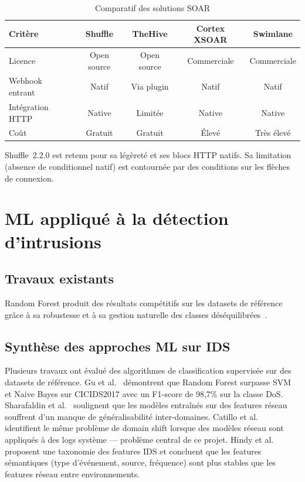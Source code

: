 \documentclass[12pt,a4paper]{report}
\begin{document}
\begin{table}[H]
\centering
\caption{Comparatif des solutions SOAR}
\label{tab:soar}
\begin{tabular}{|l|c|c|c|c|}
\hline
\rowcolor{ColSection!15}
\textbf{Critère} & \textbf{Shuffle} & \textbf{TheHive}
  & \textbf{Cortex XSOAR} & \textbf{Swimlane} \\
\hline
Licence         & Open source & Open source & Commerciale & Commerciale \\
Webhook entrant & Natif       & Via plugin  & Natif       & Natif \\
Intégration HTTP& Native      & Limitée     & Native      & Native \\
Coût            & Gratuit     & Gratuit     & Élevé       & Très élevé \\
\hline
\end{tabular}
\end{table}

Shuffle~2.2.0 est retenu pour sa légèreté et ses blocs HTTP natifs. Sa limitation (absence de conditionnel natif) est contournée par des conditions sur les flèches de connexion.

\section{ML appliqué à la détection d'intrusions}

\subsection{Travaux existants}

Random Forest produit des résultats compétitifs sur les datasets de référence grâce à sa robustesse et à sa gestion naturelle des classes déséquilibrées~\cite{breiman2001}.

\subsection{Synthèse des approches ML sur IDS}

Plusieurs travaux ont évalué des algorithmes de classification supervisée sur des datasets de référence. Gu et al.~\cite{gu2019} démontrent que Random Forest surpasse SVM et Naive Bayes sur CICIDS2017 avec un F1-score de 98,7\% sur la classe DoS. Sharafaldin et al.~\cite{cicids2017} soulignent que les modèles entraînés sur des features réseau souffrent d'un manque de généralisabilité inter-domaines. Catillo et al.~\cite{catillo2022} identifient le même problème de domain shift lorsque des modèles réseau sont appliqués à des logs système — problème central de ce projet. Hindy et al.~\cite{hindy2020} proposent une taxonomie des features IDS et concluent que les features sémantiques (type d'événement, source, fréquence) sont plus stables que les features réseau entre environnements.
\end{document}

